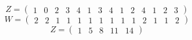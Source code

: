 \documentclass{article}
\begin{document}
$$
 Z =\left(
\begin{array}{cccccccccccccc}
1 \!&\! 0 \!&\! 2 \!&\! 3 \!&\! 4 \!&\! 1 \!&\! 3 \!&\! 4 \!&\! 1 \!&\! 2 \!&\! 4 \!&\! 1 \!&\! 2 \!&\! 3 
\end{array}
\right)$$
$$
 W =\left(
\begin{array}{cccccccccccccc}
2 \!&\! 2 \!&\! 1 \!&\! 1 \!&\! 1 \!&\! 1 \!&\! 1 \!&\! 1 \!&\! 1 \!&\! 1 \!&\! 2 \!&\! 1 \!&\! 1 \!&\! 2 
\end{array}
\right)$$
$$
 Z =\left(
\begin{array}{ccccc}
1 \!&\! 5 \!&\! 8 \!&\! 11 \!&\! 14 
\end{array}
\right)$$
\end{document}
